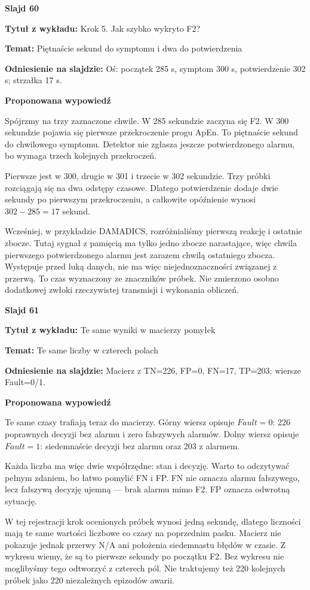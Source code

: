 \documentclass[a4paper,11pt]{article}
\newcommand{\NumerSlajdu}{1}
\newcommand{\Komentarz}[3]{%
  \gdef\NumerSlajdu{#1}%
  {\Large\bfseries Slajd #1\par}\smallskip
  \textbf{Tytuł z wykładu:} #2\par
  \textbf{Temat:} #3\par\medskip
}
\begin{document}
\Komentarz{60}{Krok 5. Jak szybko wykryto F2?}{Piętnaście sekund do symptomu i dwa do potwierdzenia}
{\small\color{black!65}\textbf{Odniesienie na slajdzie:} Oś: początek 285 s, symptom 300 s, potwierdzenie 302 s; strzałka 17 s.\par}
\medskip
\textbf{Proponowana wypowiedź}\par
Spójrzmy na trzy zaznaczone chwile. W 285 sekundzie zaczyna się F2. W 300 sekundzie pojawia się pierwsze przekroczenie progu ApEn. To piętnaście sekund do chwilowego symptomu. Detektor nie zgłasza jeszcze potwierdzonego alarmu, bo wymaga trzech kolejnych przekroczeń.

Pierwsze jest w 300, drugie w 301 i trzecie w 302 sekundzie. Trzy próbki rozciągają się na dwa odstępy czasowe. Dlatego potwierdzenie dodaje dwie sekundy po pierwszym przekroczeniu, a całkowite opóźnienie wynosi $302-285=17$ sekund.

Wcześniej, w przykładzie DAMADICS, rozróżnialiśmy pierwszą reakcję i ostatnie zbocze. Tutaj sygnał z pamięcią ma tylko jedno zbocze narastające, więc chwila pierwszego potwierdzonego alarmu jest zarazem chwilą ostatniego zbocza. Występuje przed luką danych, nie ma więc niejednoznaczności związanej z przerwą. To czas wyznaczony ze znaczników próbek. Nie zmierzono osobno dodatkowej zwłoki rzeczywistej transmisji i wykonania obliczeń.
\clearpage

\Komentarz{61}{Te same wyniki w macierzy pomyłek}{Te same liczby w czterech polach}
{\small\color{black!65}\textbf{Odniesienie na slajdzie:} Macierz z TN=226, FP=0, FN=17, TP=203; wiersze Fault=0/1.\par}
\medskip
\textbf{Proponowana wypowiedź}\par
Te same czasy trafiają teraz do macierzy. Górny wiersz opisuje $Fault=0$: 226 poprawnych decyzji bez alarmu i zero fałszywych alarmów. Dolny wiersz opisuje $Fault=1$: siedemnaście decyzji bez alarmu oraz 203 z alarmem.

Każda liczba ma więc dwie współrzędne: stan i decyzję. Warto to odczytywać pełnym zdaniem, bo łatwo pomylić FN i FP. FN nie oznacza alarmu fałszywego, lecz fałszywą decyzję ujemną — brak alarmu mimo F2. FP oznacza odwrotną sytuację.

W tej rejestracji krok ocenionych próbek wynosi jedną sekundę, dlatego liczności mają te same wartości liczbowe co czasy na poprzednim pasku. Macierz nie pokazuje jednak przerwy N/A ani położenia siedemnastu błędów w czasie. Z wykresu wiemy, że są to pierwsze sekundy po początku F2. Bez wykresu nie moglibyśmy tego odtworzyć z czterech pól. Nie traktujemy też 220 kolejnych próbek jako 220 niezależnych epizodów awarii.
\clearpage
\end{document}
